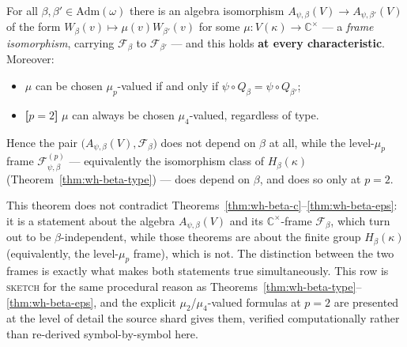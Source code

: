 
\statusSketch
\begin{theorem}[The algebra and its Weyl frame do not depend on $\beta$; the
level-$\mu_p$ frame does, at $p=2$]
\label{thm:wh-beta-level}
For all $\beta,\beta'\in\mathrm{Adm}(\omega)$ there is an algebra
isomorphism $A_{\psi,\beta}(V)\to A_{\psi,\beta'}(V)$ of the form
$W_\beta(v)\mapsto\mu(v)W_{\beta'}(v)$ for some
$\mu : V(\kappa)\to\mathbb{C}^\times$ — a \emph{frame isomorphism}, carrying
$\mathcal{F}_\beta$ to $\mathcal{F}_{\beta'}$ — and this holds \textbf{at
every characteristic}. Moreover:
\begin{itemize}
\item $\mu$ can be chosen $\mu_p$-valued if and only if
$\psi\circ Q_\beta = \psi\circ Q_{\beta'}$;
\item \textbf{[$p=2$]} $\mu$ can always be chosen $\mu_4$-valued, regardless
of type.
\end{itemize}
Hence the pair $\big(A_{\psi,\beta}(V),\mathcal{F}_\beta\big)$ does not
depend on $\beta$ at all, while the level-$\mu_p$ frame
$\mathcal{F}^{(p)}_{\psi,\beta}$ — equivalently the isomorphism class of
$H_\beta(\kappa)$ (Theorem~\ref{thm:wh-beta-type}) — does depend on $\beta$,
and does so only at $p=2$.
\end{theorem}

\begin{scope}
This theorem does not contradict Theorems~\ref{thm:wh-beta-c}--\ref{thm:wh-beta-eps}:
it is a statement about the algebra $A_{\psi,\beta}(V)$ and its
$\mathbb{C}^\times$-frame $\mathcal{F}_\beta$, which turn out to be
$\beta$-independent, while those theorems are about the finite group
$H_\beta(\kappa)$ (equivalently, the level-$\mu_p$ frame), which is not. The
distinction between the two frames is exactly what makes both statements
true simultaneously. This row is \textsc{sketch} for the same procedural
reason as Theorems~\ref{thm:wh-beta-type}--\ref{thm:wh-beta-eps}, and the
explicit $\mu_2$/$\mu_4$-valued formulas at $p=2$ are presented at the level
of detail the source shard gives them, verified computationally rather than
re-derived symbol-by-symbol here.
\end{scope}


